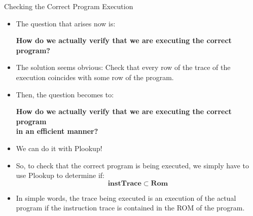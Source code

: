 \begin{frame}[allowframebreaks]{Checking the Correct Program Execution}
\begin{itemize}
\item The question that arises now is:
\begin{center}
\textbf{How do we actually verify that we are executing the correct program?}
\end{center}

\item The solution seems obvious: Check that every row of the trace of the execution coincides with some row of the program.

\item Then, the question becomes to:
\begin{center}
\textbf{How do we actually verify that we are executing the correct program \\ in an efficient manner?}
\end{center}

\item We can do it with Plookup!

\framebreak

\item So, to check that the correct program is being executed, we simply have to use Plookup to determine if:
\[
\mathbf{instTrace} \subset \mathbf{Rom}
\]

\item In simple words, the trace being executed is an execution of the actual program if the instruction trace is contained in the ROM of the program.
\end{itemize}
\end{frame}











